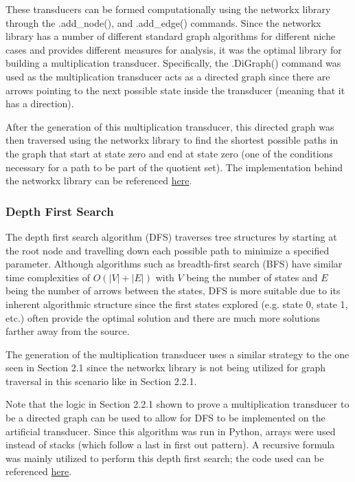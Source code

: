 \documentclass{article}
\begin{document}
These transducers can be formed computationally using the networkx library through the .add\_node(), and .add\_edge() commands. Since the networkx library has a number of different standard graph algorithms for different niche cases and provides different measures for analysis, it was the optimal library for building a multiplication transducer. Specifically, the .DiGraph() command was used as the multiplication transducer acts as a directed graph since there are arrows pointing to the next possible state inside the transducer (meaning that it has a direction).

After the generation of this multiplication transducer, this directed graph was then traversed using the networkx library to find the shortest possible paths in the graph that start at state zero and end at state zero (one of the conditions necessary for a path to be part of the quotient set). The implementation behind the networkx library can be referenced \href{https://github.com/karthikm15/Multiplication-Transducer/blob/main/networkx.py}{\color{blue} here}. \cite{Everitt2015}

\subsubsection{Depth First Search}


\hspace*{5mm} The depth first search algorithm (DFS) traverses tree structures by starting at the root node and travelling down each possible path to minimize a specified parameter. Although algorithms such as breadth-first search (BFS) have similar time complexities of $O(|V| + |E|)$ with $V$ being the number of states and $E$ being the number of arrows between the states, DFS is more suitable due to its inherent algorithmic structure since the first states explored (e.g. state 0, state 1, etc.) often provide the optimal solution and there are much more solutions farther away from the source. \vspace{\baselineskip}

The generation of the multiplication transducer uses a similar strategy to the one seen in Section 2.1 since the networkx library is not being utilized for graph traversal in this scenario like in Section 2.2.1. \vspace{\baselineskip}

Note that the logic in Section 2.2.1 shown to prove a multiplication transducer to be a directed graph can be used to allow for DFS to be implemented on the artificial transducer. Since this algorithm was run in Python, arrays were used instead of stacks (which follow a last in first out pattern). A recursive formula was mainly utilized to perform this depth first search; the code used can be referenced \href{https://github.com/karthikm15/Multiplication-Transducer/blob/main/DFS.py}{\color{blue} here}. 
\end{document}
